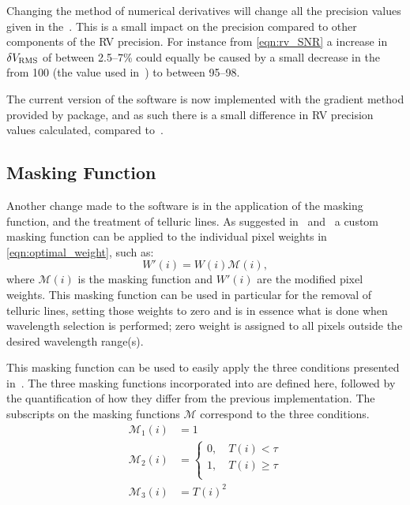 Changing the method of numerical derivatives will change all the precision values given in the~\citet{figueira_radial_2016}.
This is a small impact on the precision compared to other components of the {RV} precision.
For instance from \cref{eqn:rv_SNR} a increase in \(\delta V_{\textrm{RMS}}\) of between 2.5--7\% could equally be caused by a small decrease in the \snr{} from 100 (the value used in~\citet{figueira_radial_2016}) to between 95--98.

The current version of the software is now implemented with the gradient method provided by \numpy{} package, and as such there is a small difference in {RV} precision values calculated, compared to~\citep{figueira_radial_2016}.

\subsection{Masking Function}
\label{subsec:masking_function}
Another change made to the software is in the application of the masking function, and the treatment of telluric lines.
As suggested in~\citet{connes_absolute_1985} and~\citet{bouchy_fundamental_2001} a custom masking function can be applied to the individual pixel weights in \cref{eqn:optimal_weight}, such as:
\begin{equation}
W'(i) = W(i)\mathcal{M}(i),\label{eqn:mask_function}
\end{equation}
where \(\mathcal{M}(i)\) is the masking function and \(W'(i)\) are the modified pixel weights.
This masking function can be used in particular for the removal of telluric lines, setting those weights to zero and is in essence what is done when wavelength selection is performed; zero weight is assigned to all pixels outside the desired wavelength range(s).

This masking function can be used to easily apply the three conditions presented in~\citet{figueira_radial_2016}.
The three masking functions incorporated into \eniric{} are defined here, followed by the quantification of how they differ from the previous implementation.
The subscripts on the masking functions \(\mathcal{M}\) correspond to the three conditions.
\begin{align}
{\mathcal{M}}_{1}(i) &= 1 \label{eqn:mask1}\\
{\mathcal{M}}_{2}(i) &= \begin{cases}
0, \hspace{1em} T(i) < \tau\\
1, \hspace{1em} T(i) \ge \tau\\
\end{cases}\label{eqn:mask2}\\
{\mathcal{M}}_{3}(i) &= {T(i)}^{2} \label{eqn:mask3}
\end{align}

